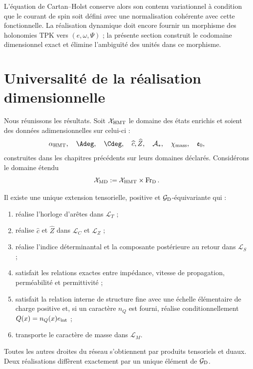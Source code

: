 L'équation de Cartan--Holst conserve alors son contenu variationnel
à condition que le courant de spin soit défini avec une normalisation cohérente
avec cette fonctionnelle. La réalisation dynamique doit encore fournir un
morphisme des holonomies TPK vers \((e,\omega,\Psi)\) ; la présente
section construit le codomaine dimensionnel exact et élimine l'ambiguïté des
unités dans ce morphisme.

\section{Universalité de la réalisation dimensionnelle}

Nous réunissons les résultats. Soit \(\mathcal X_{\rm HMT}\) le domaine des états
enrichis et soient des données adimensionnelles sur celui-ci :
\[
 \alpha_{\rm HMT},\quad \Adeg,\quad\Cdeg,\quad
 \widehat c,\widehat Z,\quad
 \mathcal A_*,\quad\chi_{\rm mass},\quad\mathfrak e_0,
\]
construites dans les chapitres précédents sur leurs domaines déclarés.
Considérons le domaine étendu
\[
 \mathcal X_{\rm MD}
 :=\mathcal X_{\rm HMT}\times\operatorname{Fr}_{\rm D}.
\]

\begin{theorem}
\label{thm:extension-dimensional-universal}
Il existe une unique extension tensorielle, positive et
\(\mathcal G_{\rm D}\)-équivariante qui :
\begin{enumerate}
 \item réalise l'horloge d'arêtes dans \(\mathcal L_T\) ;
 \item réalise \(\widehat c\) et \(\widehat Z\) dans
       \(\mathcal L_C\) et \(\mathcal L_Z\) ;
 \item réalise l'indice déterminantal et la composante postérieure au retour
       dans \(\mathcal L_S\) ;
 \item satisfait les relations exactes entre impédance, vitesse de
       propagation, perméabilité et permittivité ;
 \item satisfait la relation interne de structure fine avec une échelle élémentaire
       de charge positive et, si un caractère \(n_Q\) est fourni, réalise
       conditionnellement \(Q(x)=n_Q(x)e_{\rm int}\) ;
 \item transporte le caractère de masse dans \(\mathcal L_M\).
\end{enumerate}
Toutes les autres droites du réseau s'obtiennent par produits tensoriels et
duaux. Deux réalisations diffèrent exactement par un unique élément de
\(\mathcal G_{\rm D}\).
\end{theorem}

